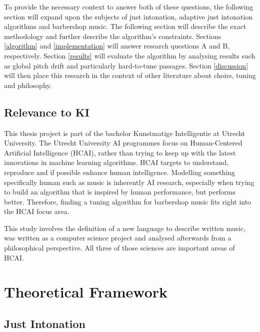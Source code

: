 \documentclass[a4paper]{article}
\begin{document}
To provide the necessary context to answer both of these questions, the following section will expand upon the subjects of just intonation, adaptive just intonation algorithms and barbershop music. The following section will describe the exact methodology and further describe the algorithm's constraints. Sections \ref{algorithm} and \ref{implementation} will answer research questions A and B, respectively. Section \ref{results} will evaluate the algorithm by analysing results such as global pitch drift and particularly hard-to-tune passages. Section \ref{discussion} will then place this research in the context of other literature about choirs, tuning and philosophy.

\subsection{Relevance to KI}
This thesis project is part of the bachelor Kunstmatige Intelligentie at Utrecht University. The Utrecht University AI programmes focus on Human-Centered Artificial Intelligence (HCAI), rather than trying to keep up with the latest innovations in machine learning algorithms. HCAI targets to understand, reproduce and if possible enhance human intelligence. \cite{utrecht_university_human-centered_2023} Modelling something specifically human such as music is inherently AI research, especially when trying to build an algorithm that is inspired by human performance, but performs better. Therefore, finding a tuning algorithm for barbershop music fits right into the HCAI focus area.

This study involves the definition of a new language to describe written music, was written as a computer science project and analysed afterwards from a philosophical perspective. All three of those sciences are important areas of HCAI.

\section{Theoretical Framework}
\subsection{Just Intonation}
\label{intro_ji}
\end{document}
